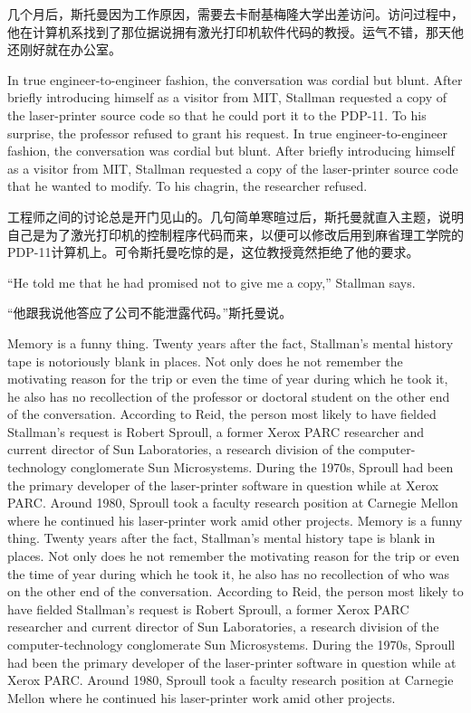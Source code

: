 \ifdefined\chs
几个月后，斯托曼因为工作原因，需要去卡耐基梅隆大学出差访问。访问过程中，他在计算机系找到了那位据说拥有激光打印机软件代码的教授。运气不错，那天他还刚好就在办公室。
\fi
\fi

\ifdefined\eng
\ifdefined\vone
In true engineer-to-engineer fashion, the conversation was cordial but blunt. After briefly introducing himself as a visitor from MIT, Stallman requested a copy of the laser-printer source code so that he could port it to the PDP-11. To his surprise, the professor refused to grant his request.
\fi
\ifdefined\vtwo
In true engineer-to-engineer fashion, the conversation was cordial but blunt. After briefly introducing himself as a visitor from MIT, Stallman requested a copy of the laser-printer source code that he wanted to modify. To his chagrin, the researcher refused.
\fi
\fi

\ifdefined\chs
工程师之间的讨论总是开门见山的。几句简单寒暄过后，斯托曼就直入主题，说明自己是为了激光打印机的控制程序代码而来，以便可以修改后用到麻省理工学院的PDP-11计算机上。可令斯托曼吃惊的是，这位教授竟然拒绝了他的要求。
\fi

\ifdefined\eng
``He told me that he had promised not to give me a copy,'' Stallman says.
\fi

\ifdefined\chs
``他跟我说他答应了公司不能泄露代码。''斯托曼说。
\fi

\ifdefined\eng
\ifdefined\vone
Memory is a funny thing. Twenty years after the fact, Stallman's mental history tape is notoriously blank in places. Not only does he not remember the motivating reason for the trip or even the time of year during which he took it, he also has no recollection of the professor or doctoral student on the other end of the conversation. According to Reid, the person most likely to have fielded Stallman's request is Robert Sproull, a former Xerox PARC researcher and current director of Sun Laboratories, a research division of the computer-technology conglomerate Sun Microsystems. During the 1970s, Sproull had been the primary developer of the laser-printer software in question while at Xerox PARC. Around 1980, Sproull took a faculty research position at Carnegie Mellon where he continued his laser-printer work amid other projects.
\fi
\ifdefined\vtwo
Memory is a funny thing. Twenty years after the fact, Stallman's mental history tape is blank in places. Not only does he not remember the motivating reason for the trip or even the time of year during which he took it, he also has no recollection of who was on the other end of the conversation. According to Reid, the person most likely to have fielded Stallman's request is Robert Sproull, a former Xerox PARC researcher and current director of Sun Laboratories, a research division of the computer-technology conglomerate Sun Microsystems. During the 1970s, Sproull had been the primary developer of the laser-printer software in question while at Xerox PARC. Around 1980, Sproull took a faculty research position at Carnegie Mellon where he continued his laser-printer work amid other projects.
\fi
\fi

